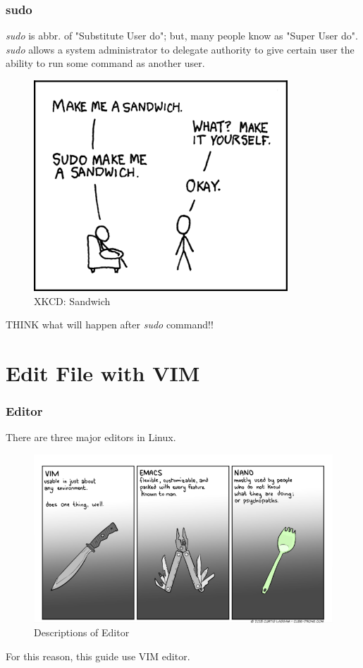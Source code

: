 \documentclass{beamer}
\begin{document}
	\begin{frame}
		\frametitle{sudo}
		\textit{sudo} is abbr. of "Substitute User do"; but, many people know as "Super User do". \\

		\textit{sudo} allows a system administrator to delegate authority to give certain user the ability to run some command as another user.
		
		\begin{figure}[h!]
			\centering
			\includegraphics[width=0.3 \linewidth]{figures/sudo.png}
			\caption{XKCD: Sandwich}
		\end{figure}
	
		THINK what will happen after \textit{sudo} command!!
	\end{frame}

	\section{Edit File with VIM} 
	
	\begin{frame}
		\frametitle{Editor}
		There are three major editors in Linux.
		\begin{figure}[h!]
			\centering
			\includegraphics[width=0.7 \linewidth]{figures/editor.png}
			\caption{Descriptions of Editor}
		\end{figure}
		For this reason, this guide use VIM editor. 
	\end{frame}
\end{document}
